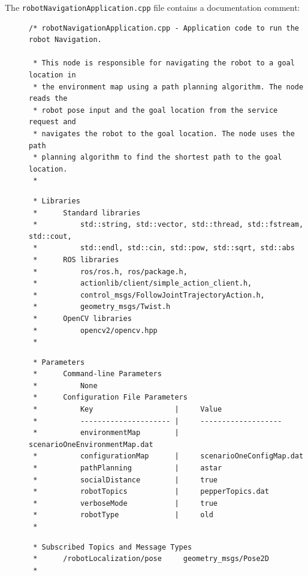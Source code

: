 \documentclass{CSSRforAfrica}
\newcommand{\checkboxChecked}{\fbox{\ding{51}}} %
\begin{document}
\noindent The {\small \verb+robotNavigationApplication.cpp+} file contains a documentation comment:

\begin{description}

\item[\checkboxChecked] 
 {\small 
\begin{verbatim}
/* robotNavigationApplication.cpp - Application code to run the robot Navigation.

 * This node is responsible for navigating the robot to a goal location in
 * the environment map using a path planning algorithm. The node reads the
 * robot pose input and the goal location from the service request and
 * navigates the robot to the goal location. The node uses the path
 * planning algorithm to find the shortest path to the goal location.
 *
\end{verbatim}}

\item[\checkboxChecked] 
 {\small 
\begin{verbatim}
 * Libraries
 *      Standard libraries
 *          std::string, std::vector, std::thread, std::fstream, std::cout,
 *          std::endl, std::cin, std::pow, std::sqrt, std::abs
 *      ROS libraries
 *          ros/ros.h, ros/package.h,
 *          actionlib/client/simple_action_client.h,
 *          control_msgs/FollowJointTrajectoryAction.h,
 *          geometry_msgs/Twist.h
 *      OpenCV libraries
 *          opencv2/opencv.hpp
 * 
\end{verbatim}}

\item[\checkboxChecked] 
 {\small 
\begin{verbatim}
 * Parameters
 *      Command-line Parameters
 *          None
 *      Configuration File Parameters
 *          Key                   |     Value 
 *          --------------------- |     -------------------
 *          environmentMap        |     scenarioOneEnvironmentMap.dat
 *          configurationMap      |     scenarioOneConfigMap.dat
 *          pathPlanning          |     astar
 *          socialDistance        |     true
 *          robotTopics           |     pepperTopics.dat
 *          verboseMode           |     true
 *          robotType             |     old
 *
\end{verbatim}}

\item[\checkboxChecked] 
 {\small 
\begin{verbatim}
 * Subscribed Topics and Message Types
 *      /robotLocalization/pose     geometry_msgs/Pose2D
 *
\end{verbatim}}


\end{description}
\end{document}
